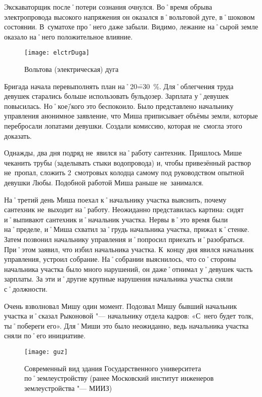 Экскаваторщик после˚потери сознания очнулся. Во˚время обрыва электропровода высокого напряжения он оказался в˚вольтовой дуге, в˚шоковом состоянии. В~суматохе про˚него даже забыли. Видимо, лежание на˚сырой земле оказало на˚него положительное влияние. 

\begin{wrapfigure}[15]{O}{.4\textwidth}
\centering
\texttt{[image: elctrDuga]}
\caption{Вольтова (электрическая) дуга}
\label{fig:elctrDuga}
\end{wrapfigure}

Бригада начала перевыполнять план на˚20\==30~\%. Для˚облегчения труда девушек старались больше использовать бульдозер. Зарплата у˚девушек повысилась. Но˚кое\=/кого это беспокоило. Было представлено начальнику управления анонимное заявление, что Миша приписывает объёмы земли, которые перебросали лопатами девушки. Создали комиссию, которая не~смогла этого доказать.

Однажды, два дня подряд не~явился на˚работу сантехник. Пришлось Мише чеканить трубы (заделывать стыки водопровода) и, чтобы привезённый раствор не~пропал, сложить 2~смотровых колодца самому под руководством опытной девушки Любы. Подобной работой Миша раньше не~занимался.

На˚третий день Миша поехал к˚начальнику участка выяснить, почему сантехник не~выходит на˚работу. Неожиданно представилась картина: сидят и˚выпивают сантехник и˚начальник участка. Нервы в˚это время были на˚пределе, и˚Миша схватил за˚грудь начальника участка, прижал к˚стенке. Затем позвонил начальнику управления и˚попросил приехать и˚разобраться. При˚этом заявил, что избил начальника участка. К~концу дня явился начальник управления, устроил собрание. На˚собрании выяснилось, что со˚стороны начальника участка было много нарушений, он даже˚отнимал у˚девушек часть зарплаты. За эти и˚другие крупные нарушения начальника участка сняли с˚должности. 

Очень взволновал Мишу один момент. Подозвал Мишу бывший начальник участка и˚сказал Рыконовой "--- начальнику отдела кадров: «С~него будет толк, ты˚побереги его». Для˚Миши это было неожиданно, ведь начальника участка сняли по˚его инициативе. 

\begin{wrapfigure}{O}{.4\textwidth}
\centering
\texttt{[image: guz]}
\caption[Современный вид здания Государственного университета по˚землеустройству (Ранее Московский институт инженеров землеустройства "--- МИИЗ)]{Современный вид здания Государственного университета по˚землеустройству (ранее Московский институт инженеров землеустройства "--- МИИЗ)\footnotemark}
\label{fig:guz}
\end{wrapfigure}

